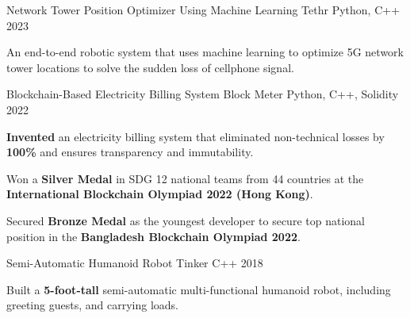 

\begin{cventries}

  \cventry
    {Network Tower Position Optimizer Using Machine Learning} %
    {Tethr} %
    {Python, C++} %
    {2023} %
    {
      \begin{cvitems} %
        \item {An end-to-end robotic system that uses machine learning to optimize 5G network tower locations 
        to solve the sudden loss of cellphone signal.}
      \end{cvitems}
    }

  \cventry
    {Blockchain-Based Electricity Billing System } %
    {Block Meter} %
    {Python, C++, Solidity} %
    {2022} %
    {
      \begin{cvitems} %
        \item {\textbf{Invented} an electricity billing system that eliminated non-technical losses by \textbf{100\%} and ensures transparency and immutability.}
        \item {Won a \textbf{Silver Medal} in SDG 12 national teams from 44 countries at the \textbf{International Blockchain Olympiad 2022 (Hong Kong)}.}
        \item {Secured \textbf{Bronze Medal} as the youngest developer to secure top national position in the \textbf{Bangladesh Blockchain Olympiad 2022}.}
      \end{cvitems}
    }

  \cventry
    {Semi-Automatic Humanoid Robot} %
    {Tinker} %
    {C++} %
    {2018} %
    {
      \begin{cvitems} %
        \item { Built a \textbf{5-foot-tall} semi-automatic multi-functional humanoid robot, including greeting guests, and carrying loads.}
      \end{cvitems}
    }


\end{cventries}
